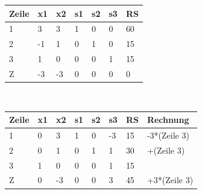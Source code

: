 \begin{table}[!ht]
\begin{tabular}{|l|l|l|l|l|l|l|}
\hline
\rowcolor[HTML]{C0C0C0} 
Zeile                     & x1                         & x2                        & s1                        & s2                        & s3                        & RS \\ \hline
\cellcolor[HTML]{C0C0C0}1 & \cellcolor[HTML]{FFFFFF}3  & \cellcolor[HTML]{FFFFFF}3 & \cellcolor[HTML]{FFFFFF}1 & \cellcolor[HTML]{FFFFFF}0 & \cellcolor[HTML]{FFFFFF}0 & 60 \\ \hline
\cellcolor[HTML]{C0C0C0}2 & \cellcolor[HTML]{FFFFFF}-1 & \cellcolor[HTML]{FFFFFF}1 & \cellcolor[HTML]{FFFFFF}0 & \cellcolor[HTML]{FFFFFF}1 & \cellcolor[HTML]{FFFFFF}0 & 15 \\ \hline
\cellcolor[HTML]{C0C0C0}3 & \cellcolor[HTML]{DAE8FC}1  & \cellcolor[HTML]{FFFFFF}0 & \cellcolor[HTML]{FFFFFF}0 & \cellcolor[HTML]{FFFFFF}0 & \cellcolor[HTML]{FFFFFF}1 & 15 \\ \hline
\cellcolor[HTML]{C0C0C0}Z & -3                         & -3                        & 0                         & 0                         & 0                         & 0  \\ \hline
\end{tabular}
\end{table}
\\
\begin{table}[!ht]
\begin{tabular}{|l|l|l|l|l|l|l|l|}
\hline
\rowcolor[HTML]{C0C0C0} 
Zeile                     & x1                        & x2                        & s1                        & s2                        & s3                         & RS & Rechnung     \\ \hline
\cellcolor[HTML]{C0C0C0}1 & \cellcolor[HTML]{FFFFFF}0 & \cellcolor[HTML]{CBCEFB}3 & \cellcolor[HTML]{FFFFFF}1 & \cellcolor[HTML]{FFFFFF}0 & \cellcolor[HTML]{FFFFFF}-3 & 15 & -3*(Zeile 3) \\ \hline
\cellcolor[HTML]{C0C0C0}2 & \cellcolor[HTML]{FFFFFF}0 & \cellcolor[HTML]{FFFFFF}1 & \cellcolor[HTML]{FFFFFF}0 & \cellcolor[HTML]{FFFFFF}1 & \cellcolor[HTML]{FFFFFF}1  & 30 & +(Zeile 3)   \\ \hline
\cellcolor[HTML]{C0C0C0}3 & \cellcolor[HTML]{FFFFFF}1 & \cellcolor[HTML]{FFFFFF}0 & \cellcolor[HTML]{FFFFFF}0 & \cellcolor[HTML]{FFFFFF}0 & \cellcolor[HTML]{FFFFFF}1  & 15 &              \\ \hline
\cellcolor[HTML]{C0C0C0}Z & 0                         & -3                        & 0                         & 0                         & 3                          & 45 & +3*(Zeile 3) \\ \hline
\end{tabular}
\end{table}
